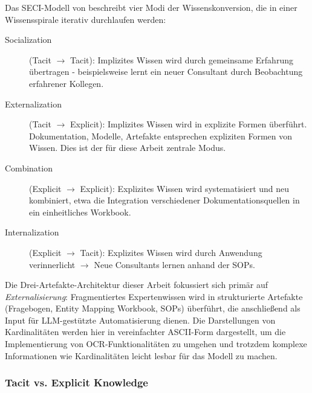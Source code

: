 Das SECI-Modell von \cite{nonaka:knowledge_creating_company1995} beschreibt vier Modi der Wissenskonversion, die in einer Wissensspirale iterativ durchlaufen werden:

\begin{description}
    \item[Socialization] (Tacit $\rightarrow$ Tacit): Implizites Wissen wird durch gemeinsame Erfahrung übertragen - beispielsweise lernt ein neuer Consultant durch Beobachtung erfahrener Kollegen.
    \item[Externalization] (Tacit $\rightarrow$ Explicit): Implizites Wissen wird in explizite Formen überführt. Dokumentation, Modelle, Artefakte entsprechen expliziten Formen von Wissen. Dies ist der für diese Arbeit zentrale Modus.
    \item[Combination] (Explicit $\rightarrow$ Explicit): Explizites Wissen wird systematisiert und neu kombiniert, etwa die Integration verschiedener Dokumentationsquellen in ein einheitliches Workbook.
    \item[Internalization] (Explicit $\rightarrow$ Tacit): Explizites Wissen wird durch Anwendung verinnerlicht $\rightarrow$ Neue Consultants lernen anhand der SOPs.
\end{description}

\noindent Die Drei-Artefakte-Architektur dieser Arbeit fokussiert sich primär auf \textit{Externalisierung}: Fragmentiertes Expertenwissen wird in strukturierte Artefakte (Fragebogen, Entity Mapping Workbook, SOPs) überführt, die anschließend als Input für LLM-gestützte Automatisierung dienen. Die Darstellungen von Kardinalitäten werden hier in vereinfachter ASCII-Form dargestellt, um die Implementierung von OCR-Funktionalitäten zu umgehen und trotzdem komplexe Informationen wie Kardinalitäten leicht lesbar für das Modell zu machen. 

\subsubsection{Tacit vs. Explicit Knowledge}
\label{subsubsec:TacitExplicit}

